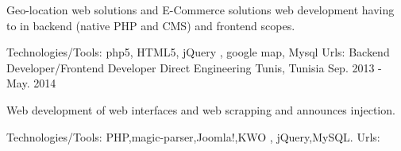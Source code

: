 \begin{cventries}
    {
      \begin{cvitems}
        \item {Geo-location web solutions and E-Commerce solutions web development having to in backend (native PHP and CMS) and frontend scopes.}
      \end{cvitems}
    }
    {\textcolor{awesome}{Technologies/Tools: } {\color{graytext}}  {php5, HTML5, jQuery , google map, Mysql}}
    {Urls:} 
    {\href{http://www.taxitasso.com/}{} \break
    \href{http://carafrika.net/}{} \break
    \href{http://darafrika.com/}{} \break    
    }       
  \techentries
    {Backend Developer/Frontend Developer}
    {Direct Engineering}
    {Tunis, Tunisia}
    {Sep. 2013 - May. 2014}
    {
      \begin{cvitems}
        \item {Web development of web interfaces and web scrapping and announces injection. }
      \end{cvitems}
    }
    {\textcolor{awesome}{Technologies/Tools: } {\color{graytext}}  {PHP,magic-parser,Joomla!,KWO , jQuery,MySQL.}}
    {Urls:} 
    {\href{http://www.pure-jobs.com/}{} \break
    \href{http://www.jeveux1truc.fr/fr/}{} \break
    }       
\end{cventries}
